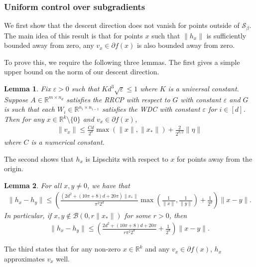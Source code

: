 \documentclass[11pt]{article}
\renewcommand{\epsilon}{\varepsilon}
\newcommand{\R}{\mathbb{R}}
\newcommand{\Seps}{\mathcal{S}}
\newcommand{\G}{G}
\newtheorem{lem}{Lemma}
\theoremstyle{remark}
\begin{document}
\subsubsection{Uniform control over subgradients} \label{conv_proof_zero_subsection}

We first show that the descent direction does not vanish for points outside of $\Seps_{\beta}$. The main idea of this result is that for points $x$ such that $\|h_x\|$ is sufficiently bounded away from zero, any $v_x \in \partial f(x)$ is also bounded away from zero. 

To prove this, we require the following three lemmas. The first gives a simple upper bound on the norm of our descent direction.

\begin{lem}\label{bound_on_norm_of_v}
Fix $\epsilon > 0$ such that $K d^3 \sqrt{\epsilon} \leqslant 1$ where $K$ is a universal constant. Suppose $A \in \R^{m \times n_d}$ satisfies the RRCP with respect to $\G$ with constant $\epsilon$ and $\G$ is such that each $W_i \in \R^{n_i \times n_{i-1}}$ satisfies the WDC with constant $\epsilon$ for $i \in [d]$. Then for any $x \in \R^k \setminus \{0\}$ and $v_x \in \partial f(x)$, \begin{align*}
    \|v_x\| \leqslant \frac{Cd}{2^d}\max(\|x\|,\|x_*\|) + \frac{2}{2^{d/2}}\|\eta\|
\end{align*} where $C$ is a numerical constant.
\end{lem}

\noindent The second shows that $h_x$ is Lipschitz with respect to $x$ for points away from the origin.

\begin{lem} \label{h_lipschitz_lemma}
For all $x,y\neq 0$, we have that \begin{align*}
\|h_x - h_y\| \leqslant \left(\frac{(2d^2 + (10\pi+8)d+20\pi)\|x_*\|}{\pi^2 2^d}\max\left(\frac{1}{\|x\|},\frac{1}{\|y\|}\right) + \frac{1}{2^d}\right) \|x-y\|.
\end{align*} In particular, if $x,y\notin \mathcal{B}(0,r\|x_*\|)$ for some $r > 0$, then \begin{align*}
\|h_x-h_y\| \leqslant \left(\frac{2d^2 + (10\pi+8)d+20\pi}{r\pi^2 2^d} + \frac{1}{2^d}\right)\|x-y\|.
\end{align*} 
\end{lem}

\noindent The third states that for any non-zero $x \in \R^k$ and any $v_x \in \partial f(x)$, $h_x$ approximates $v_x$ well.
\end{document}
